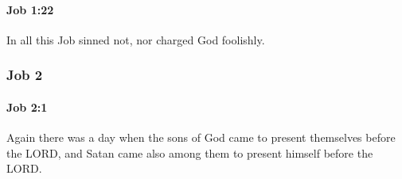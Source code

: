 		\paragraph{Job 1:22} %
			\label{JOB-1-22}

			In all this Job sinned not, nor charged God foolishly.

	\subsubsection{Job 2} %
		\label{JOB-2}

		\paragraph{Job 2:1} %
			\label{JOB-2-1}

			Again there was a day when the sons of God came to present themselves before the LORD, and Satan came also among them to present himself before the LORD.


